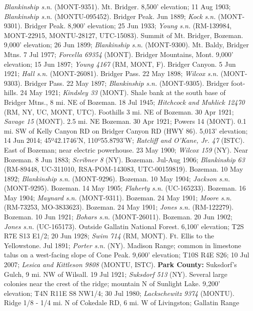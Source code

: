 \textit{Blankinship s.n.} (MONT-9351).
Mt. Bridger. 8,500' elevation; 11 Aug 1903; \textit{Blankinship s.n.}
(MONTU-095452).
Bridger Peak. Jun 1889; \textit{Kock s.n.} (MONT-9301).
Bridger Peak. 8,900' elevation; 25 Jun 1933;
\textit{Young s.n.} (RM-139984, MONT-22915, MONTU-28127, UTC-15083).
Summit of Mt. Bridger, Bozeman. 9,000' elevation; 26 Jun 1899;
\textit{Blankinship s.n.} (MONT-9300).
Mt. Baldy, Bridger Mtns. 7 Jul 1977; \textit{Forcella 69354} (MONT).
Bridger Mountains, Mont. 9,000’ elevation; 15 Jun 1897;
\textit{Young 4167} (RM, MONT, F).
Bridger Canyon. 5 Jun 1921; \textit{Hall s.n.} (MONT-26081).
Bridger Pass. 22 May 1898; \textit{Wilcox s.n.} (MONT-9303).
Bridger Pass. 22 May 1897; \textit{Blankinship s.n.} (MONT-9305).
Bridger foot-hills. 24 May 1921; \textit{Kindsley 33} (MONT).
Shale bank at the south base of Bridger Mtns., 8 mi. NE of Bozeman. 18 Jul 1945;
\textit{Hitchcock and Muhlick 12470} (RM, NY, UC, MONT, UTC).
Foothills 3 mi. NE of Bozeman. 30 Apr 1921; \textit{Savage 15} (MONT).
2.5 mi. NE Bozeman. 30 Apr 1921; Powers 14 (MONT).
0.1 mi. SW of Kelly Canyon RD on Bridger Canyon RD (HWY 86). 5,013'
elevation; 14 Jun 2014; 45º42.1746'N, 110º55.8793'W;
\textit{Ratcliff and O'Kane, Jr. 47} (ISTC).
East of Bozeman; near electric powerhouse. 23 May 1900;
\textit{Wilcox 159} (NY).
Near Bozeman. 8 Jun 1883; \textit{Scribner 8} (NY).
Bozeman. Jul-Aug 1906; \textit{Blankinship 63}
(RM-89448, UC-311010, RSA-POM-143083, UTC-00159819).
Bozeman. 10 May 1892; \textit{Blankinship s.n.} (MONT-9296).
Bozeman. 10 May 1904; \textit{Jackson s.n.} (MONT-9295).
Bozeman. 14 May 1905; \textit{Flaherty s.n.} (UC-165233).
Bozeman. 16 May 1904; \textit{Maynard s.n.} (MONT-9311).
Bozeman. 24 May 1901; \textit{Moore s.n.} (RM-73253, MO-3833623).
Bozeman. 24 May 1901; \textit{Jones s.n.} (RM-122279).
Bozeman. 10 Jun 1921; \textit{Bohars s.n.} (MONT-26011).
Bozeman. 20 Jun 1902; \textit{Jones s.n.} (UC-165173).
Outside Gallatin National Forest. 6,100' elevation; T2S R7E S13 E1/2;
20 Jun 1928; \textit{Swim 714} (RM, MONT).
Ft. Ellis to the Yellowstone. Jul 1891; \textit{Porter s.n.} (NY).
Madison Range; common in limestone talus on a west-facing slope of Cone Peak.
9,600' elevation; T10S R4E S26; 10 Jul 2007;
\textit{Lesica and Kittleson 9808} (MONTU, ISTC).
  \textbf{Park County:}
Suksdorf's Gulch, 9 mi. NW of Wilsall. 19 Jul 1921; \textit{Suksdorf 513} (NY).
Several large colonies near the crest of the ridge; mountain N of Sunlight Lake.
9,200' elevation; T4N R11E S8 NW1/4; 30 Jul 1980;
\textit{Lackschewitz 9374} (MONTU).
Ridge 1/8 - 1/4 mi. N of Cokedale RD, 6 mi. W of Livingston; Gallatin Range
